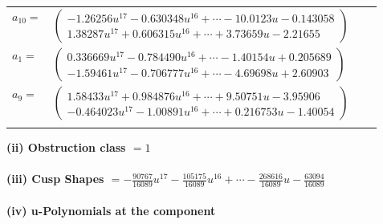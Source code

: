 \documentclass[1p]{elsarticle_modified}
\theoremstyle{definition}
\begin{document}
\begin{tabular}{m{7pt} m{180pt} m{7pt} m{180pt} }
\flushright $a_{10}=$&$\begin{pmatrix}-1.26256 u^{17}-0.630348 u^{16}+\cdots-10.0123 u-0.143058\\1.38287 u^{17}+0.606315 u^{16}+\cdots+3.73659 u-2.21655\end{pmatrix}$ \\
\flushright $a_{1}=$&$\begin{pmatrix}0.336669 u^{17}-0.784490 u^{16}+\cdots-1.40154 u+0.205689\\-1.59461 u^{17}-0.706777 u^{16}+\cdots-4.69698 u+2.60903\end{pmatrix}$ \\
\flushright $a_{9}=$&$\begin{pmatrix}1.58433 u^{17}+0.984876 u^{16}+\cdots+9.50751 u-3.95906\\-0.464023 u^{17}-1.00891 u^{16}+\cdots+0.216753 u-1.40054\end{pmatrix}$\\&\end{tabular}
\flushleft \textbf{(ii) Obstruction class $= 1$}\\~\\
\flushleft \textbf{(iii) Cusp Shapes $= -\frac{90767}{16089} u^{17}-\frac{105175}{16089} u^{16}+\cdots-\frac{268616}{16089} u-\frac{63094}{16089}$}\\~\\
\newpage\renewcommand{\arraystretch}{1}
\flushleft \textbf{(iv) u-Polynomials at the component}\newline \\
\end{document}
